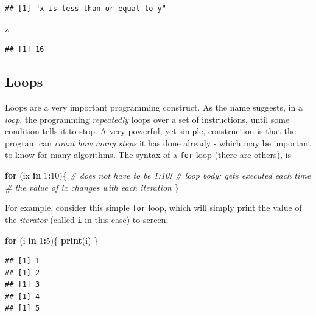 \documentclass[]{book}
\newenvironment{Shaded}{\begin{snugshade}}{\end{snugshade}}
\newcommand{\KeywordTok}[1]{\textcolor[rgb]{0.13,0.29,0.53}{\textbf{#1}}}
\newcommand{\DecValTok}[1]{\textcolor[rgb]{0.00,0.00,0.81}{#1}}
\newcommand{\CommentTok}[1]{\textcolor[rgb]{0.56,0.35,0.01}{\textit{#1}}}
\newcommand{\ControlFlowTok}[1]{\textcolor[rgb]{0.13,0.29,0.53}{\textbf{#1}}}
\newcommand{\OperatorTok}[1]{\textcolor[rgb]{0.81,0.36,0.00}{\textbf{#1}}}
\newcommand{\NormalTok}[1]{#1}
\begin{document}
\begin{verbatim}
## [1] "x is less than or equal to y"
\end{verbatim}

\begin{Shaded}
\begin{Highlighting}[]
\NormalTok{z}
\end{Highlighting}
\end{Shaded}

\begin{verbatim}
## [1] 16
\end{verbatim}

\subsection{Loops}\label{loops}

Loops are a very important programming construct. As the name suggests,
in a \emph{loop}, the programming \emph{repeatedly} loops over a set of
instructions, until some condition tells it to stop. A very powerful,
yet simple, construction is that the program can \emph{count how many
steps} it has done already - which may be important to know for many
algorithms. The syntax of a \texttt{for} loop (there are others), is

\begin{Shaded}
\begin{Highlighting}[]
\ControlFlowTok{for}\NormalTok{ (ix }\ControlFlowTok{in} \DecValTok{1}\OperatorTok{:}\DecValTok{10}\NormalTok{)\{   }\CommentTok{# does not have to be 1:10!}
  \CommentTok{# loop body: gets executed each time}
  \CommentTok{# the value of ix changes with each iteration}
\NormalTok{\}}
\end{Highlighting}
\end{Shaded}

For example, consider this simple \texttt{for} loop, which will simply
print the value of the \emph{iterator} (called \texttt{i} in this case)
to screen:

\begin{Shaded}
\begin{Highlighting}[]
\ControlFlowTok{for}\NormalTok{ (i }\ControlFlowTok{in} \DecValTok{1}\OperatorTok{:}\DecValTok{5}\NormalTok{)\{}
  \KeywordTok{print}\NormalTok{(i)}
\NormalTok{\}}
\end{Highlighting}
\end{Shaded}

\begin{verbatim}
## [1] 1
## [1] 2
## [1] 3
## [1] 4
## [1] 5
\end{verbatim}
\end{document}
